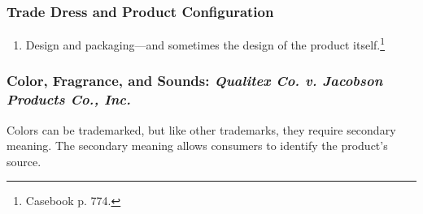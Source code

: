\subsubsection{Trade Dress and Product Configuration}

\begin{enumerate}
    \item Design and packaging---and sometimes the design of the product 
    itself.\footnote{Casebook p. 774.}
\end{enumerate}

\subsubsection{Color, Fragrance, and Sounds: \emph{Qualitex Co. v. Jacobson 
Products Co., Inc.}}

Colors can be trademarked, but like other trademarks, they require secondary 
meaning. The secondary meaning allows consumers to identify the product's 
source.

